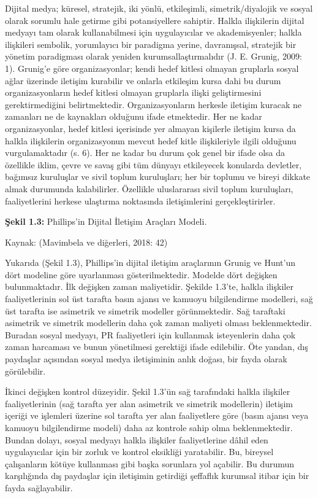 \documentclass[
]{book}
\begin{document}
Dijital medya; küresel, stratejik, iki yönlü, etkileşimli, simetrik/diyalojik ve sosyal olarak sorumlu hale getirme gibi potansiyellere sahiptir. Halkla ilişkilerin dijital medyayı tam olarak kullanabilmesi için uygulayıcılar ve akademisyenler; halkla ilişkileri sembolik, yorumlayıcı bir paradigma yerine, davranışsal, stratejik bir yönetim paradigması olarak yeniden kurumsallaştırmalıdır (J. E. Grunig, 2009: 1). Grunig'e göre organizasyonlar; kendi hedef kitlesi olmayan gruplarla sosyal ağlar üzerinde iletişim kurabilir ve onlarla etkileşim kursa dahi bu durum organizasyonların hedef kitlesi olmayan gruplarla ilişki geliştirmesini gerektirmediğini belirtmektedir. Organizasyonların herkesle iletişim kuracak ne zamanları ne de kaynakları olduğunu ifade etmektedir. Her ne kadar organizasyonlar, hedef kitlesi içerisinde yer almayan kişilerle iletişim kursa da halkla ilişkilerin organizasyonun mevcut hedef kitle ilişkileriyle ilgili olduğunu vurgulamaktadır (s. 6). \citep{grunig2009paradigms} Her ne kadar bu durum çok genel bir ifade olsa da özellikle iklim, çevre ve savaş gibi tüm dünyayı etkileyecek konularda devletler, bağımsız kuruluşlar ve sivil toplum kuruluşları; her bir toplumu ve bireyi dikkate almak durumunda kalabilirler. Özellikle uluslararası sivil toplum kuruluşları, faaliyetlerini herkese ulaştırma noktasında iletişimlerini gerçekleştirirler.

\textbf{Şekil 1.3:} Phillips'in Dijital İletişim Araçları Modeli.

Kaynak: (Mavimbela ve diğerleri, 2018: 42)

Yukarıda (Şekil 1.3), Phillips'in dijital iletişim araçlarının Grunig ve Hunt'un dört modeline göre uyarlanması gösterilmektedir. Modelde dört değişken bulunmaktadır. İlk değişken zaman maliyetidir. Şekilde 1.3'te, halkla ilişkiler faaliyetlerinin sol üst tarafta basın ajansı ve kamuoyu bilgilendirme modelleri, sağ üst tarafta ise asimetrik ve simetrik modeller görünmektedir. Sağ taraftaki asimetrik ve simetrik modellerin daha çok zaman maliyeti olması beklenmektedir. Buradan sosyal medyayı, PR faaliyetleri için kullanmak isteyenlerin daha çok zaman harcaması ve bunun yönetilmesi gerektiği ifade edilebilir. Öte yandan, dış paydaşlar açısından sosyal medya iletişiminin anlık doğası, bir fayda olarak görülebilir.

İkinci değişken kontrol düzeyidir. Şekil 1.3'ün sağ tarafındaki halkla ilişkiler faaliyetlerinin (sağ tarafta yer alan asimetrik ve simetrik modellerin) iletişim içeriği ve işlemleri üzerine sol tarafta yer alan faaliyetlere göre (basın ajansı veya kamuoyu bilgilendirme modeli) daha az kontrole sahip olma beklenmektedir. Bundan dolayı, sosyal medyayı halkla ilişkiler faaliyetlerine dâhil eden uygulayıcılar için bir zorluk ve kontrol eksikliği yaratabilir. Bu, bireysel çalışanların kötüye kullanması gibi başka sorunlara yol açabilir. Bu durumun karşılığında dış paydaşlar için iletişimin getirdiği şeffaflık kurumsal itibar için bir fayda sağlayabilir.
\end{document}
